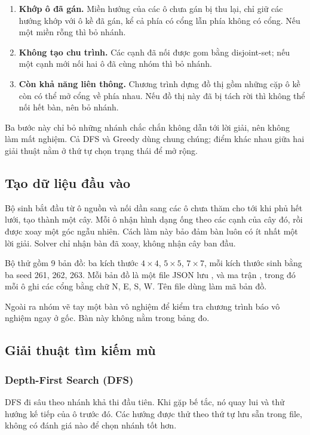 \begin{enumerate}
\item \textbf{Khớp ô đã gán.} Miền hướng của các ô chưa gán bị thu lại, chỉ
giữ các hướng khớp với ô kề đã gán, kể cả phía có cổng lẫn phía không có cổng.
Nếu một miền rỗng thì bỏ nhánh.
\item \textbf{Không tạo chu trình.} Các cạnh đã nối được gom bằng disjoint-set;
nếu một cạnh mới nối hai ô đã cùng nhóm thì bỏ nhánh.
\item \textbf{Còn khả năng liên thông.} Chương trình dựng đồ thị gồm những cặp
ô kề còn có thể mở cổng về phía nhau. Nếu đồ thị này đã bị tách rời thì không
thể nối hết bàn, nên bỏ nhánh.
\end{enumerate}

Ba bước này chỉ bỏ những nhánh chắc chắn không dẫn tới lời giải, nên không làm
mất nghiệm. Cả DFS và Greedy dùng chung chúng; điểm khác nhau giữa hai giải
thuật nằm ở thứ tự chọn trạng thái để mở rộng.

\subsection{Tạo dữ liệu đầu vào}
Bộ sinh bắt đầu từ ô nguồn và nối dần sang các ô chưa thăm cho tới khi phủ
hết lưới, tạo thành một cây. Mỗi ô nhận hình dạng ống theo các cạnh của cây
đó, rồi được xoay một góc ngẫu nhiên. Cách làm này bảo đảm bàn luôn có ít nhất
một lời giải. Solver chỉ nhận bàn đã xoay, không nhận cây ban đầu.

Bộ thử gồm 9 bản đồ: ba kích thước $4\times4$, $5\times5$, $7\times7$,
mỗi kích thước sinh bằng ba seed 261, 262, 263. Mỗi bản đồ là một file JSON
lưu ,  và ma trận , trong đó mỗi ô ghi
các cổng bằng chữ N, E, S, W. Tên file dùng làm mã bản đồ.

Ngoài ra nhóm vẽ tay một bàn vô nghiệm  để kiểm
tra chương trình báo vô nghiệm ngay ở gốc. Bàn này không nằm trong bảng đo.

\subsection{Giải thuật tìm kiếm mù}
\subsubsection*{Depth-First Search (DFS)}

DFS đi sâu theo nhánh khả thi đầu tiên. Khi gặp bế tắc, nó quay lui và thử
hướng kế tiếp của ô trước đó. Các hướng được thử theo thứ tự lưu sẵn trong
file, không có đánh giá nào để chọn nhánh tốt hơn.

